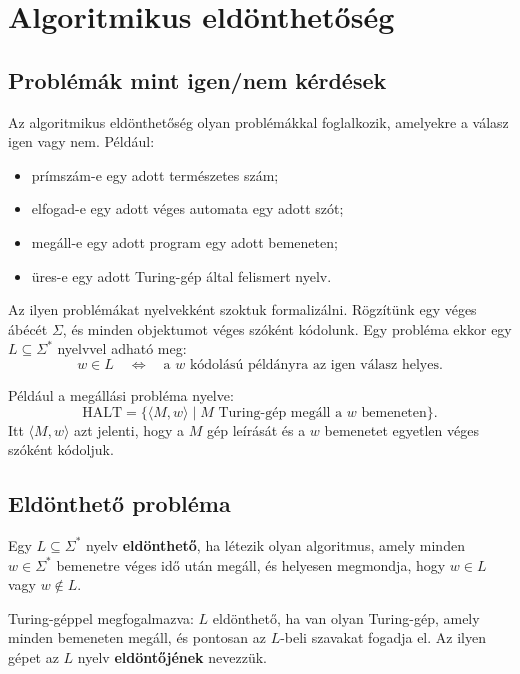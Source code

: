 \begin{center}

\end{center}

\section{Algoritmikus eldönthetőség}

\subsection{Problémák mint igen/nem kérdések}

Az algoritmikus eldönthetőség olyan problémákkal foglalkozik, amelyekre a válasz igen vagy nem. Például:

\begin{itemize}
  \item prímszám-e egy adott természetes szám;
  \item elfogad-e egy adott véges automata egy adott szót;
  \item megáll-e egy adott program egy adott bemeneten;
  \item üres-e egy adott Turing-gép által felismert nyelv.
\end{itemize}

Az ilyen problémákat nyelvekként szoktuk formalizálni. Rögzítünk egy véges ábécét $\Sigma$, és minden objektumot véges szóként kódolunk. Egy probléma ekkor egy $L\subseteq\Sigma^*$ nyelvvel adható meg:
\[
  w\in L \quad\Longleftrightarrow\quad
  \text{a } w \text{ kódolású példányra az igen válasz helyes.}
\]

Például a megállási probléma nyelve:
\[
  \mathrm{HALT}=\{\langle M,w\rangle\mid
  M \text{ Turing-gép megáll a } w \text{ bemeneten}\}.
\]
Itt $\langle M,w\rangle$ azt jelenti, hogy a $M$ gép leírását és a $w$ bemenetet egyetlen véges szóként kódoljuk.

\subsection{Eldönthető probléma}

Egy $L\subseteq\Sigma^*$ nyelv \textbf{eldönthető}, ha létezik olyan algoritmus, amely minden $w\in\Sigma^*$ bemenetre véges idő után megáll, és helyesen megmondja, hogy $w\in L$ vagy $w\notin L$.

Turing-géppel megfogalmazva: $L$ eldönthető, ha van olyan Turing-gép, amely minden bemeneten megáll, és pontosan az $L$-beli szavakat fogadja el. Az ilyen gépet az $L$ nyelv \textbf{eldöntőjének} nevezzük.

